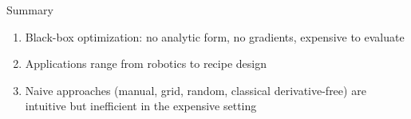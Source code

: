 \documentclass[main]{subfiles}
\begin{document}

\begin{frame}{Summary}
\begin{enumerate}
    \item Black-box optimization: no analytic form, no gradients, expensive to evaluate
    \item Applications range from robotics to recipe design
    \item Naive approaches (manual, grid, random, classical derivative-free) are intuitive but inefficient in the expensive setting
\end{enumerate}
\end{frame}
\end{document}
